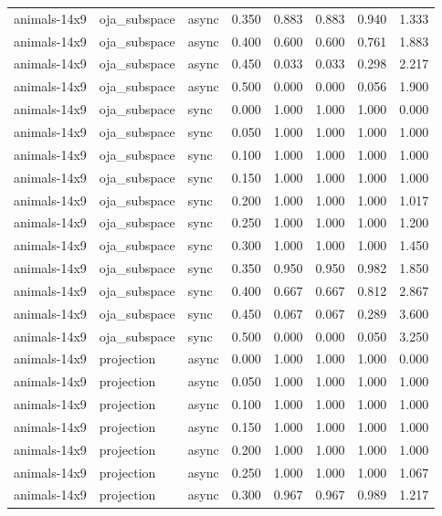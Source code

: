\begin{tabular}{lllrrrrr}
animals-14x9 & oja\_subspace & async & 0.350 & 0.883 & 0.883 & 0.940 & 1.333 \\
animals-14x9 & oja\_subspace & async & 0.400 & 0.600 & 0.600 & 0.761 & 1.883 \\
animals-14x9 & oja\_subspace & async & 0.450 & 0.033 & 0.033 & 0.298 & 2.217 \\
animals-14x9 & oja\_subspace & async & 0.500 & 0.000 & 0.000 & 0.056 & 1.900 \\
animals-14x9 & oja\_subspace & sync & 0.000 & 1.000 & 1.000 & 1.000 & 0.000 \\
animals-14x9 & oja\_subspace & sync & 0.050 & 1.000 & 1.000 & 1.000 & 1.000 \\
animals-14x9 & oja\_subspace & sync & 0.100 & 1.000 & 1.000 & 1.000 & 1.000 \\
animals-14x9 & oja\_subspace & sync & 0.150 & 1.000 & 1.000 & 1.000 & 1.000 \\
animals-14x9 & oja\_subspace & sync & 0.200 & 1.000 & 1.000 & 1.000 & 1.017 \\
animals-14x9 & oja\_subspace & sync & 0.250 & 1.000 & 1.000 & 1.000 & 1.200 \\
animals-14x9 & oja\_subspace & sync & 0.300 & 1.000 & 1.000 & 1.000 & 1.450 \\
animals-14x9 & oja\_subspace & sync & 0.350 & 0.950 & 0.950 & 0.982 & 1.850 \\
animals-14x9 & oja\_subspace & sync & 0.400 & 0.667 & 0.667 & 0.812 & 2.867 \\
animals-14x9 & oja\_subspace & sync & 0.450 & 0.067 & 0.067 & 0.289 & 3.600 \\
animals-14x9 & oja\_subspace & sync & 0.500 & 0.000 & 0.000 & 0.050 & 3.250 \\
animals-14x9 & projection & async & 0.000 & 1.000 & 1.000 & 1.000 & 0.000 \\
animals-14x9 & projection & async & 0.050 & 1.000 & 1.000 & 1.000 & 1.000 \\
animals-14x9 & projection & async & 0.100 & 1.000 & 1.000 & 1.000 & 1.000 \\
animals-14x9 & projection & async & 0.150 & 1.000 & 1.000 & 1.000 & 1.000 \\
animals-14x9 & projection & async & 0.200 & 1.000 & 1.000 & 1.000 & 1.000 \\
animals-14x9 & projection & async & 0.250 & 1.000 & 1.000 & 1.000 & 1.067 \\
animals-14x9 & projection & async & 0.300 & 0.967 & 0.967 & 0.989 & 1.217 \\

\end{tabular}
